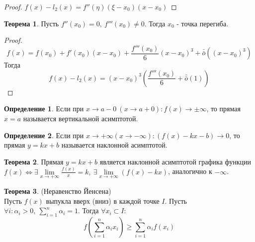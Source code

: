 \documentclass[a4paper, 12pt]{article}
\theoremstyle{definition}
\newtheorem*{definition}{Определение}
\newtheorem*{theorem}{Теорема}
\begin{document}
        \begin{proof}
            $f(x)-l_2(x)=f''(\eta)(\xi-x_0)(x-x_0)$
        \end{proof} 
        \begin{theorem}
            Пусть $f''(x_0)=0,\ f'''(x_0)\ne 0$. Тогда $x_0$ - точка перегиба.
        \end{theorem} 
        \begin{proof}
            \[f(x)=f(x_0)+f'(x_0)(x-x_0)+\frac{f'''(x_0)}{6}(x-x_0)^3+\bar{\bar{o}}{((x-x_0)^3)}\] 
            Тогда
            \[f(x)-l_2(x)=(x-x_0)^3(\frac{f'''(x_0)}{6}+\bar{\bar{o}}{(1)})\]
        \end{proof} 
        \begin{definition}
            Если при $x\to a-0\ (x\to a+0): f(x)\to \pm \infty$, то прямая $x=a$ называется вертикальной асимптотой.
        \end{definition} 
        \begin{definition}
            Если при $x\to +\infty (x\to -\infty): (f(x)-kx-b)\to 0$, то прямая $y=kx+b$ называется наклонной асимптотой.
        \end{definition} 
        \begin{theorem}
            Прямая $y=kx+b$ является наклонной асимптотой графика функции $f(x) \Leftrightarrow \exists \lim\limits_{x\to +\infty}\frac{f(x)}{x}=k,\ \exists \lim\limits_{x\to +\infty}(f(x)-kx)$, аналогично к $-\infty$.
        \end{theorem} 
        \begin{theorem} (Неравенство Йенсена)\\
            Пусть $f(x)$ выпукла вверх (вниз) в каждой точке $I$. Пусть $\forall i: \alpha_i>0,\ \sum\limits_{i=1}^{n}\alpha_i=1$. Тогда $\forall x_i \subset I$:
            \[f(\sum\limits_{i=1}^{n}\alpha_i x_i) \geq \sum\limits_{i=1}^{n}\alpha_i f(x_i)\]
        \end{theorem} 
\end{document}
